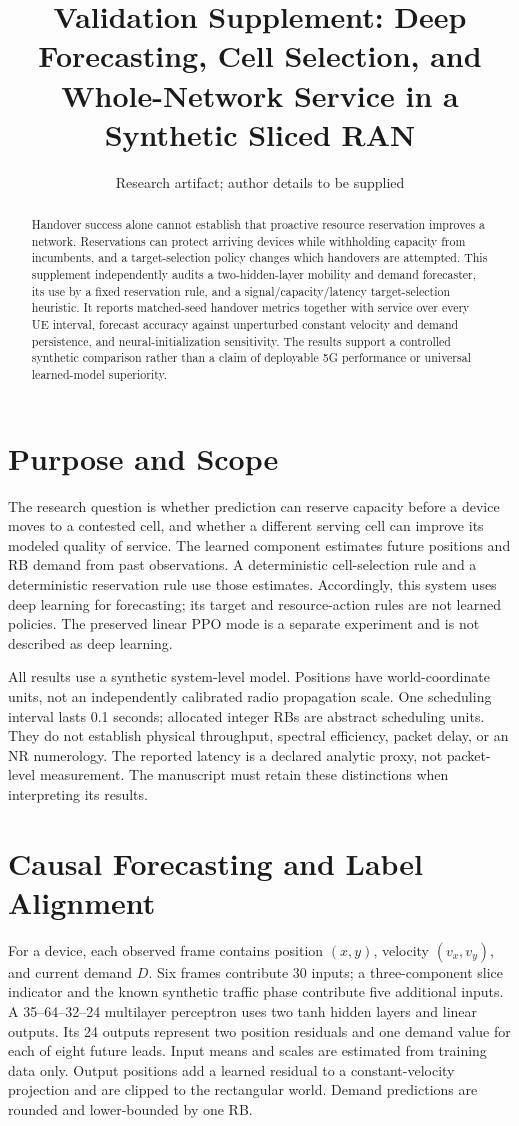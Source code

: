 \documentclass[journal]{IEEEtran}
\title{Validation Supplement: Deep Forecasting, Cell Selection, and Whole-Network Service in a Synthetic Sliced RAN}
\author{Research artifact; author details to be supplied}
\begin{document}
\maketitle
\begin{abstract}
Handover success alone cannot establish that proactive resource reservation improves a network. Reservations can protect arriving devices while withholding capacity from incumbents, and a target-selection policy changes which handovers are attempted. This supplement independently audits a two-hidden-layer mobility and demand forecaster, its use by a fixed reservation rule, and a signal/capacity/latency target-selection heuristic. It reports matched-seed handover metrics together with service over every UE interval, forecast accuracy against unperturbed constant velocity and demand persistence, and neural-initialization sensitivity. The results support a controlled synthetic comparison rather than a claim of deployable 5G performance or universal learned-model superiority.
\end{abstract}

\section{Purpose and Scope}
The research question is whether prediction can reserve capacity before a device moves to a contested cell, and whether a different serving cell can improve its modeled quality of service. The learned component estimates future positions and RB demand from past observations. A deterministic cell-selection rule and a deterministic reservation rule use those estimates. Accordingly, this system uses deep learning for forecasting; its target and resource-action rules are not learned policies. The preserved linear PPO mode is a separate experiment and is not described as deep learning.

All results use a synthetic system-level model. Positions have world-coordinate units, not an independently calibrated radio propagation scale. One scheduling interval lasts 0.1 seconds; allocated integer RBs are abstract scheduling units. They do not establish physical throughput, spectral efficiency, packet delay, or an NR numerology. The reported latency is a declared analytic proxy, not packet-level measurement. The manuscript must retain these distinctions when interpreting its results.

\section{Causal Forecasting and Label Alignment}
For a device, each observed frame contains position $(x,y)$, velocity $(v_x,v_y)$, and current demand $D$. Six frames contribute 30 inputs; a three-component slice indicator and the known synthetic traffic phase contribute five additional inputs. A 35--64--32--24 multilayer perceptron uses two tanh hidden layers and linear outputs. Its 24 outputs represent two position residuals and one demand value for each of eight future leads. Input means and scales are estimated from training data only. Output positions add a learned residual to a constant-velocity projection and are clipped to the rectangular world. Demand predictions are rounded and lower-bounded by one RB.
\end{document}
